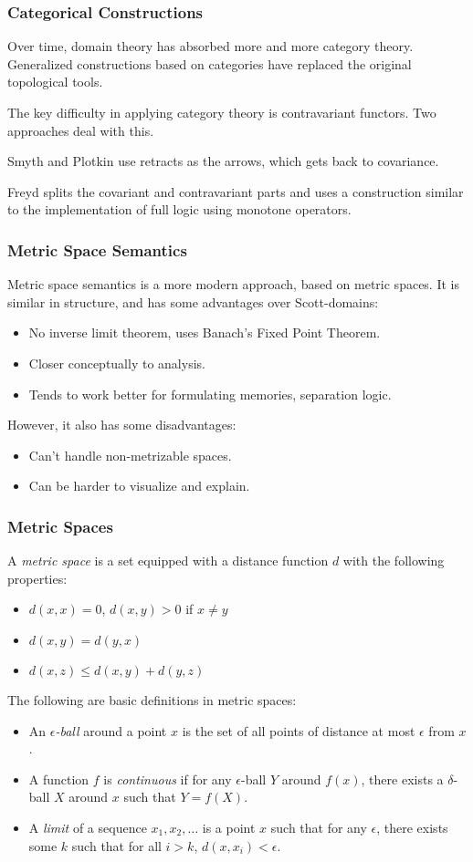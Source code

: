 \documentclass{beamer}
\begin{document}
\begin{frame}
  \frametitle{Categorical Constructions}
  Over time, domain theory has absorbed more and more category theory.
  Generalized constructions based on categories have replaced the
  original topological tools.

  The key difficulty in applying category theory is contravariant
  functors.  Two approaches deal with this.

  Smyth and Plotkin use retracts as the arrows, which gets back to
  covariance.

  Freyd splits the covariant and contravariant parts and uses a
  construction similar to the implementation of full logic using
  monotone operators.
\end{frame}

\begin{frame}
  \frametitle{Metric Space Semantics}
  Metric space semantics is a more modern approach, based on metric
  spaces.  It is similar in structure, and has some advantages over
  Scott-domains:
  \begin{itemize}
    \item No inverse limit theorem, uses Banach's Fixed Point Theorem.
    \item Closer conceptually to analysis.
    \item Tends to work better for formulating memories, separation logic.
  \end{itemize}
  However, it also has some disadvantages:
  \begin{itemize}
    \item Can't handle non-metrizable spaces.
    \item Can be harder to visualize and explain.
  \end{itemize}
\end{frame}

\begin{frame}
  \frametitle{Metric Spaces}
  A \emph{metric space} is a set equipped with a distance function $d$
  with the following properties:
  \begin{itemize}
    \item $d(x, x) = 0$, $d(x, y) > 0$ if $x \neq y$
    \item $d(x, y) = d(y, x)$
    \item $d(x, z) \leq d(x, y) + d(y, z)$
  \end{itemize}
  The following are basic definitions in metric spaces:
  \begin{itemize}
    \item An \emph{$\epsilon$-ball} around a point $x$ is the set of
      all points of distance at most $\epsilon$ from $x$.
    \item A function $f$ is \emph{continuous} if for any
      $\epsilon$-ball $Y$ around $f(x)$, there exists a $\delta$-ball
      $X$ around $x$ such that $Y = f(X)$.
    \item A \emph{limit} of a sequence $x_1, x_2,\ldots$ is a point
      $x$ such that for any $\epsilon$, there exists some $k$ such
      that for all $i > k$, $d(x, x_i) < \epsilon$.
  \end{itemize}
\end{frame}
\end{document}
